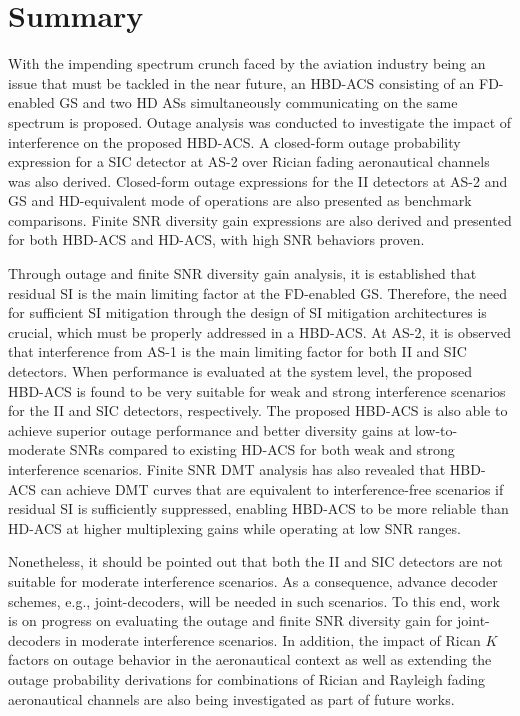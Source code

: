 \section{Summary} \label{section:summary}

With the impending spectrum crunch faced by the aviation industry being an issue that must be tackled in the near future, an HBD-ACS consisting of an FD-enabled GS and two HD ASs simultaneously communicating on the same spectrum is proposed. Outage analysis was conducted to investigate the impact of interference on the proposed HBD-ACS. A closed-form outage probability expression for a SIC detector at AS-2 over Rician fading aeronautical channels was also derived. Closed-form outage expressions for the II detectors at AS-2 and GS and HD-equivalent mode of operations are also presented as benchmark comparisons. Finite SNR diversity gain expressions are also derived and presented for both HBD-ACS and HD-ACS, with high SNR behaviors proven. 

Through outage and finite SNR diversity gain analysis, it is established that residual SI is the main limiting factor at the FD-enabled GS. Therefore, the need for sufficient SI mitigation through the design of SI mitigation architectures is crucial, which must be properly addressed in a HBD-ACS. At AS-2, it is observed that interference from AS-1 is the main limiting factor for both II and SIC detectors. When performance is evaluated at the system level, the proposed HBD-ACS is found to be very suitable for weak and strong interference scenarios for the II and SIC detectors, respectively. The proposed HBD-ACS is also able to achieve superior outage performance and better diversity gains at low-to-moderate SNRs compared to existing HD-ACS for both weak and strong interference scenarios. Finite SNR DMT analysis has also revealed that HBD-ACS can achieve DMT curves that are equivalent to interference-free scenarios if residual SI is sufficiently suppressed, enabling HBD-ACS to be more reliable than HD-ACS at higher multiplexing gains while operating at low SNR ranges.

Nonetheless, it should be pointed out that both the II and SIC detectors are not suitable for moderate interference scenarios. As a consequence, advance decoder schemes, e.g., joint-decoders, will be needed in such scenarios. To this end, work is on progress on evaluating the outage and finite SNR diversity gain for joint-decoders in moderate interference scenarios. In addition, the impact of Rican $K$ factors on outage behavior in the aeronautical context as well as extending the outage probability derivations for combinations of Rician and Rayleigh fading aeronautical channels are also being investigated as part of future works.


